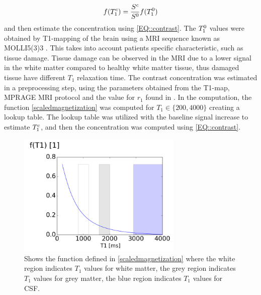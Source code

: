 \documentclass[12pt,a4paper]{article}
\begin{document}
\begin{equation}
f ( T_{1}\sp{c} ) = \frac{S\sp{c}}{S\sp{0}} f(T_{1}\sp{0}) 
\end{equation}
and then estimate the concentration using \eqref{EQ::contrast}. The $T_{1}\sp{0}$ values were obtained by T1-mapping of the brain using a MRI sequence known as MOLLI5(3)3 \cite{TAYLOR201667}. This takes into account patients specific characteristic, such as tissue damage. Tissue damage can be observed in the MRI due to a lower signal in the white matter compared to healthy white matter tissue, thus damaged tissue have different $T_1$ relaxation time. 
The contrast concentration was estimated in a preprocessing step, using the parameters obtained from the T1-map, MPRAGE MRI protocol \cite{ringstad2018brain} and the value for $r_1$ found in \cite{pmid16230904}. In the computation, the function \eqref{scaledmagnetization} was computed for $ T_1\in \lbrace 200, 4000 \rbrace$ creating a lookup table. The lookup table was utilized with the baseline signal increase to estimate $T_1\sp{c}$, and then the concentration was computed using \eqref{EQ::contrast}.  

\begin{figure}
\centering
\includegraphics[width=0.70\textwidth]{T1function.png} 
\caption{Shows the  function defined in \eqref{scaledmagnetization} where the white region indicates $T_1$ values for white matter, the grey region indicates $T_1$ values for grey matter, the blue region indicates $T_1$ values for CSF.  }
\label{figureF} 
\end{figure}
\end{document}
